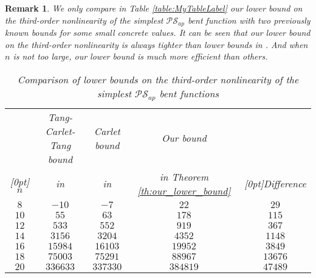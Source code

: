 \documentclass{article}
\newcommand{\0}{\textbf{0}}
\newcommand{\1}{\textbf{1}}
\theoremstyle{plain}
\newtheorem{remark}{Remark}
\begin{document}
    \begin{remark}
        \newcommand{\rb}[1]{\raisebox{1.5ex}[0pt]{#1}}
        We only compare in Table \ref{table:MyTableLabel} our lower bound on the third-order nonlinearity of the simplest $\mathcal{PS}_{ap}$ bent function with two previously known bounds for some small concrete values. 
        It can be seen that our lower bound on the third-order nonlinearity is always tighter than lower bounds in \cite{TangCT2013NL_2bent,Carlet2011NL_Profile_Dillon}. 
        And when $n$ is not too large, our lower bound is much more efficient than others. 
        \begin{table}                                           
            \centering                                              
            \caption{Comparison of lower bounds on the third-order nonlinearity of the simplest $\mathcal{PS}_{ap}$ bent functions}                       
            \begin{threeparttable}
                \begin{tabular}{|c|c|c|c|c|}                                      
                    \hline   
                            & Tang-Carlet-Tang bound      & Carlet bound                            & Our bound& \\  
                    \rb{$n$}& in \cite{TangCT2013NL_2bent}& in \cite{Carlet2011NL_Profile_Dillon} & in Theorem \ref{th:our_lower_bound}     &\rb{Difference\tnote{1}}   \\
                    \hline         
                    $8  $ &  $ -10         $       & $ -7       $     & $ 22       $     & $  29      $ \\  \hline     
                    $10 $ &  $ 55          $       & $ 63       $     & $ 178      $     & $  115     $ \\  \hline     
                    $12 $ &  $ 533         $       & $ 552      $     & $ 919      $     & $  367     $ \\  \hline     
                    $14 $ &  $ 3156        $       & $ 3204     $     & $ 4352     $     & $  1148    $ \\  \hline     
                    $16 $ &  $ 15984       $       & $ 16103    $     & $ 19952    $     & $  3849    $ \\  \hline     
                    $18 $ &  $ 75003       $       & $ 75291    $     & $ 88967    $     & $  13676   $ \\  \hline     
                    $20 $ &  $ 336633      $       & $ 337330   $     & $ 384819   $     & $  47489   $ \\  \hline     

\end{tabular}
\end{threeparttable}
\end{table}
\end{remark}
\end{document}
